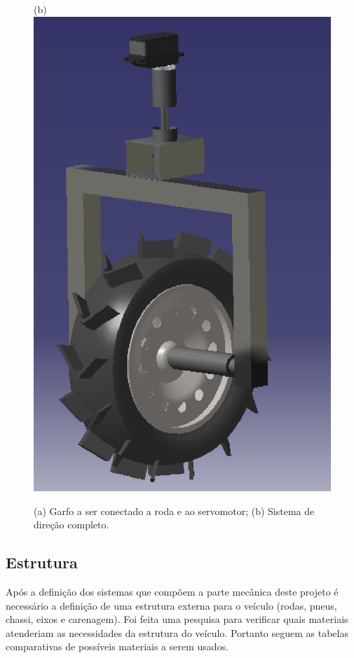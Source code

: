 \begin{figure}[!htbp]
\begin{center}
        	(b)\includegraphics[height=.3\textheight]{figuras/d2.eps}
     		\caption{(a) Garfo a ser conectado a roda e ao servomotor; (b) Sistema de direção completo.}
     	\end{center}
     \end{figure}
      
  \subsection{Estrutura}
  Após a definição dos sistemas que compõem a parte mecânica deste projeto é necessário a definição de uma estrutura externa para o veículo (rodas, pneus, chassi, eixos e carenagem). Foi feita uma pesquisa para verificar quais materiais atenderiam as necessidades da estrutura do veículo. Portanto seguem as tabelas comparativas de possíveis materiais a serem usados.

